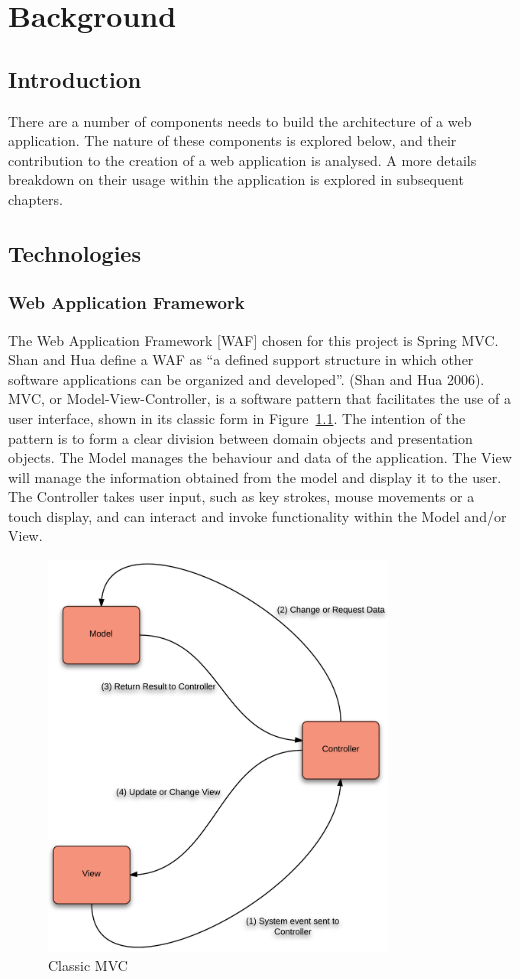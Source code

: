 \chapter{Background}
\label{background}

\section{Introduction}

There are a number of components needs to build the architecture of a web application. The nature of these components is explored below, and their contribution to the creation of a web application is analysed. A more details breakdown on their usage within the application is explored in subsequent chapters.

\section{Technologies}

\subsection{Web Application Framework}
The Web Application Framework [WAF] chosen for this project is Spring MVC. Shan and Hua define a WAF as “a defined support structure in which other software applications can be organized and developed”. (Shan and Hua 2006). MVC, or Model-View-Controller, is a software pattern that facilitates the use of a user interface, shown in its classic form in Figure~\ref{fig:mvcclassic}. The intention of the pattern is to form a clear division between domain objects and presentation objects. The Model manages the behaviour and data of the application. The View will manage the information obtained from the model and display it to the user. The Controller takes user input, such as key strokes, mouse movements or a touch display, and can interact and invoke functionality within the Model and/or View.

\begin{figure}[H]
\begin{center}
\includegraphics[width=9cm]{mvcclassic.png}
\end{center}
\caption{Classic MVC}
\label{fig:mvcclassic}
\end{figure}

